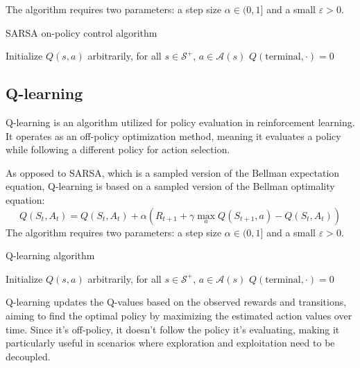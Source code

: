 The algorithm requires two parameters: a step size $\alpha\in(0,1]$ and a small $\varepsilon>0$.
\begin{algorithm}[H]
    \caption{SARSA on-policy control algorithm}
        \begin{algorithmic}[1]
            \State Initialize $Q(s,a)$ arbitrarily, for all $s\in\mathcal{S}^{+}$, $a \in \mathcal{A}(s)$
            \State $Q(\text{terminal},\cdot)=0$
            \Loop
            \EndLoop
        \end{algorithmic}
\end{algorithm}


\subsection{Q-learning}
Q-learning is an algorithm utilized for policy evaluation in reinforcement learning. 
It operates as an off-policy optimization method, meaning it evaluates a policy while following a different policy for action selection.

As opposed to SARSA, which is a sampled version of the Bellman expectation equation, Q-learning is based on a sampled version of the Bellman optimality equation:
\[Q(S_t,A_t)=Q(S_t,A_t)+\alpha\left(R_{t+1}+\gamma\max_aQ(S_{t+1},a)-Q(S_t,A_t)\right)\]
The algorithm requires two parameters: a step size $\alpha\in(0,1]$ and a small $\varepsilon>0$.
\begin{algorithm}[H]
    \caption{Q-learning algorithm}
        \begin{algorithmic}[1]
            \State Initialize $Q(s,a)$ arbitrarily, for all $s\in\mathcal{S}^{+}$, $a \in \mathcal{A}(s)$
            \State $Q(\text{terminal},\cdot)=0$
            \Loop
            \EndLoop
        \end{algorithmic}
\end{algorithm}
Q-learning updates the Q-values based on the observed rewards and transitions, aiming to find the optimal policy by maximizing the estimated action values over time.
Since it's off-policy, it doesn't follow the policy it's evaluating, making it particularly useful in scenarios where exploration and exploitation need to be decoupled.

